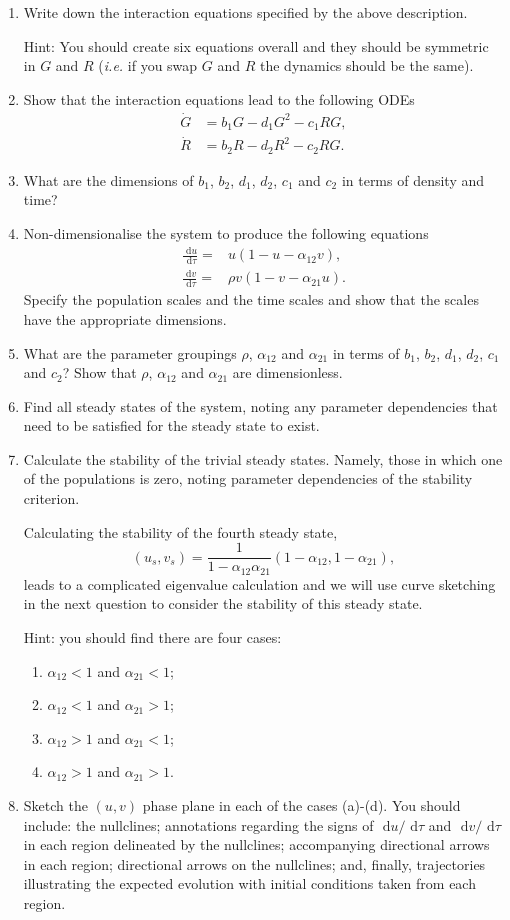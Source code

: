 \documentclass[]{article}
\newcommand{\bb}{\begin{equation}}
\newcommand{\ee}{\end{equation}}
\newcommand{\rd}{\text{ d}}
\newcommand{\ie}{\emph{i.e.} }
\begin{document}
\begin{enumerate}
\item Write down the interaction equations specified by the above description.

Hint: You should create six equations overall and they should be symmetric in $G$ and $R$ (\ie if you swap $G$ and $R$ the dynamics should be the same).
\item Show that the interaction equations lead to the following ODEs
\begin{align}
\dot{G}&=b_1G-d_1G^2-c_1RG,\\
\dot{R}&=b_2R-d_2R^2-c_2RG.
\end{align}

\item What are the dimensions of $b_1$, $b_2$, $d_1$, $d_2$, $c_1$ and $c_2$ in terms of density and time?
\item Non-dimensionalise the system to produce the following equations
\begin{align}
\frac{\rd u}{\rd \tau}=&u(1-u-\alpha_{12}v),\\
\frac{\rd v}{\rd \tau}=&\rho v(1-v-\alpha_{21}u).
\end{align}
Specify the population scales and the time scales and show that the scales have the appropriate dimensions.
\item What are the parameter groupings $\rho$, $\alpha_{12}$ and $\alpha_{21}$ in terms of $b_1$, $b_2$, $d_1$, $d_2$, $c_1$ and $c_2$? Show that $\rho$, $\alpha_{12}$ and $\alpha_{21}$ are dimensionless.
\item Find all steady states of the system, noting any parameter dependencies that need to be satisfied for the steady state to exist.
\item Calculate the stability of the trivial steady states. Namely, those in which one of the populations is zero, noting parameter dependencies of the stability criterion.

Calculating the stability of the fourth steady state,
\bb
(u_s,v_s)=\frac{1}{1-\alpha_{12}\alpha_{21}}(1-\alpha_{12},1-\alpha_{21}),
\ee
leads to a complicated eigenvalue calculation and we will use curve sketching in the next question to consider the stability of this steady state.

Hint: you should find there are four cases:
\begin{enumerate}
\item $\alpha_{12}<1$ and $\alpha_{21}<1$; \item $\alpha_{12}<1$ and $\alpha_{21}>1$;
\item $\alpha_{12}>1$ and $\alpha_{21}<1$;
\item $\alpha_{12}>1$ and $\alpha_{21}>1$.
\end{enumerate}
\item Sketch the $(u,v)$ phase plane in each of the cases (a)-(d). You should include: the nullclines; annotations regarding the signs of $\rd u/\rd \tau$ and $\rd v/\rd \tau$ in each region delineated by the nullclines; accompanying directional arrows in each region; directional arrows on the nullclines; and, finally, trajectories illustrating the expected evolution with initial conditions taken from each region.


\end{enumerate}
\end{document}
